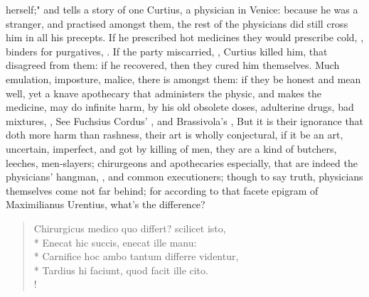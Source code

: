 {herself;" and tells a story of one Curtius, a physician in Venice: because he was a stranger, and practised amongst them, the rest of the physicians did still cross him in all his precepts. If he prescribed hot medicines they would prescribe cold, , binders for purgatives, . If the party miscarried, , Curtius killed him, that disagreed from them: if he recovered, then they cured him themselves. Much emulation, imposture, malice, there is amongst them: if they be honest and mean well, yet a knave apothecary that administers the physic, and makes the medicine, may do infinite harm, by his old obsolete doses, adulterine drugs, bad mixtures, , \etc{} See Fuchsius  Cordus' , and Brassivola's , \etc{} But it is their ignorance that doth more harm than rashness, their art is wholly conjectural, if it be an art, uncertain, imperfect, and got by killing of men, they are a kind of butchers, leeches, men-slayers; chirurgeons and apothecaries especially, that are indeed the physicians' hangman, , and common executioners; though to say truth, physicians themselves come not far behind; for according to that facete epigram of Maximilianus Urentius, what's the difference?

%
\begin{latin}%
\begin{verse}%
Chirurgicus medico quo differt? scilicet isto,\\*
Enecat hic succis, enecat ille manu:\\*
Carnifice hoc ambo tantum differre videntur,\\*
Tardius hi faciunt, quod facit ille cito.\\!
\end{verse}%
\end{latin}%

}
